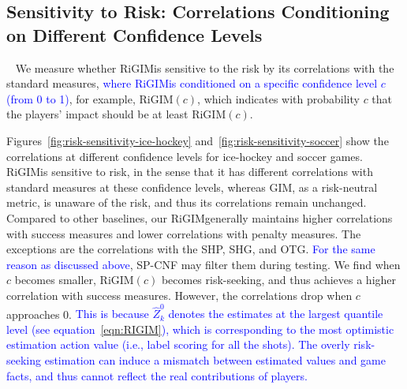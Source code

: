 \documentclass{article}
\newcommand{\agentIndex}{k}
\newcommand{\confidence}{c}
\newcommand{\sys}{RiGIM}
\newcommand{\system}{\sys\;}
\begin{document}
\subsection{Sensitivity to Risk: Correlations Conditioning on Different Confidence Levels}~\label{subsec:risk-sensitive-results}
We measure whether \system is sensitive to the risk by its correlations with the standard measures, \textcolor{blue}{where \system is conditioned on a specific confidence level $\confidence$ (from 0 to 1)}, for example, \sys$(c)$, which indicates with probability $\confidence$ that the players' impact should be at least \sys$(\confidence)$.

Figures~\ref{fig:risk-sensitivity-ice-hockey} and~\ref{fig:risk-sensitivity-soccer} show the correlations at different confidence levels for ice-hockey and soccer games. \system is sensitive to risk, in the sense that it has different correlations with standard measures at these confidence levels, whereas GIM, as a risk-neutral metric, is unaware of the risk, and thus its correlations remain unchanged. 
Compared to other baselines, our \system generally maintains higher correlations with success measures and lower correlations with penalty measures. The exceptions are the correlations with the SHP, SHG, and OTG. \textcolor{blue}{ For the same reason as discussed above}, SP-CNF may filter them during testing. 
We find when $\confidence$ becomes smaller, \sys$(\confidence)$ becomes risk-seeking, and thus achieves a higher correlation with success measures. However, the correlations drop when $\confidence$ approaches 0.
\textcolor{blue}{This is because $\hat{Z}_{\agentIndex}^{0}$ denotes the estimates at the largest quantile level (see equation~\ref{eqn:RIGIM}), which is corresponding to the most optimistic estimation action value (i.e., label scoring for all the shots). The overly risk-seeking estimation can induce a mismatch between estimated values and game facts, and thus cannot reflect the real contributions of players.}
\end{document}
